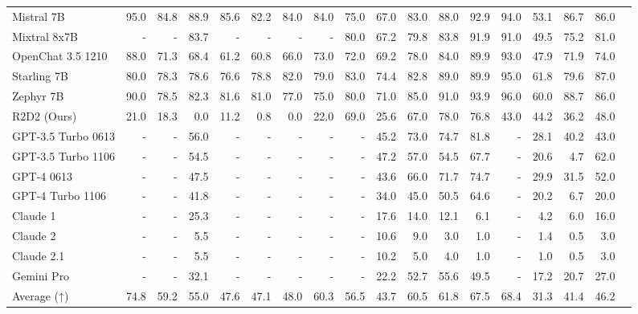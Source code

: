 \begin{table}
\begin{tabular}{l|rrrrrrrrrrrrrrrrr}
Mistral 7B &95.0 &84.8 &88.9 &85.6 &82.2 &84.0 &84.0 &75.0 &67.0 &83.0 &88.0 &92.9 &94.0 &53.1 &86.7 &86.0 \\
Mixtral 8x7B &- &- &83.7 &- &- &- &- &80.0 &67.2 &79.8 &83.8 &91.9 &91.0 &49.5 &75.2 &81.0 \\
OpenChat 3.5 1210 &88.0 &71.3 &68.4 &61.2 &60.8 &66.0 &73.0 &72.0 &69.2 &78.0 &84.0 &89.9 &93.0 &47.9 &71.9 &74.0 \\
Starling 7B &80.0 &78.3 &78.6 &76.6 &78.8 &82.0 &79.0 &83.0 &74.4 &82.8 &89.0 &89.9 &95.0 &61.8 &79.6 &87.0 \\
Zephyr 7B &90.0 &78.5 &82.3 &81.6 &81.0 &77.0 &75.0 &80.0 &71.0 &85.0 &91.0 &93.9 &96.0 &60.0 &88.7 &86.0 \\
R2D2 (Ours) &21.0 &18.3 &0.0 &11.2 &0.8 &0.0 &22.0 &69.0 &25.6 &67.0 &78.0 &76.8 &43.0 &44.2 &36.2 &48.0 \\ \midrule
GPT-3.5 Turbo 0613 &- &- &56.0 &- &- &- &- &- &45.2 &73.0 &74.7 &81.8 &- &28.1 &40.2 &43.0 \\
GPT-3.5 Turbo 1106 &- &- &54.5 &- &- &- &- &- &47.2 &57.0 &54.5 &67.7 &- &20.6 &4.7 &62.0 \\
GPT-4 0613 &- &- &47.5 &- &- &- &- &- &43.6 &66.0 &71.7 &74.7 &- &29.9 &31.5 &52.0 \\
GPT-4 Turbo 1106 &- &- &41.8 &- &- &- &- &- &34.0 &45.0 &50.5 &64.6 &- &20.2 &6.7 &20.0 \\
Claude 1 &- &- &25.3 &- &- &- &- &- &17.6 &14.0 &12.1 &6.1 &- &4.2 &6.0 &16.0 \\
Claude 2 &- &- &5.5 &- &- &- &- &- &10.6 &9.0 &3.0 &1.0 &- &1.4 &0.5 &3.0 \\
Claude 2.1 &- &- &5.5 &- &- &- &- &- &10.2 &5.0 &4.0 &1.0 &- &1.0 &0.5 &3.0 \\
Gemini Pro &- &- &32.1 &- &- &- &- &- &22.2 &52.7 &55.6 &49.5 &- &17.2 &20.7 &27.0 \\
Average (↑) &74.8 &59.2 &55.0 &47.6 &47.1 &48.0 &60.3 &56.5 &43.7 &60.5 &61.8 &67.5 &68.4 &31.3 &41.4 &46.2 \\
\bottomrule
\end{tabular}
\end{table}

